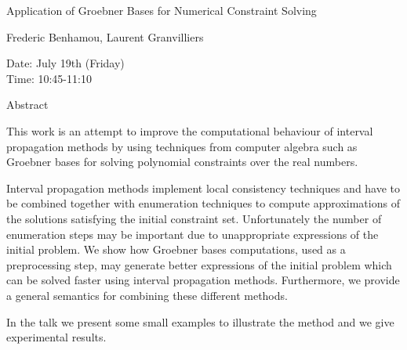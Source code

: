 \begin{center}
\LARGE
Application of Groebner Bases for Numerical Constraint
                             Solving

\end{center}

\begin{center}
\Large
Frederic Benhamou, Laurent Granvilliers

\end{center}

\noindent
Date:  July 19th (Friday)\\
Time:  10:45-11:10\\

\begin{center}
\large
Abstract
\end{center}

This work is an attempt to improve the computational behaviour of interval propagation methods
by using techniques from computer algebra such as Groebner bases for solving polynomial
constraints over the real numbers. 

Interval propagation methods implement local consistency techniques and have to be combined
together with enumeration techniques to compute approximations of the solutions satisfying the
initial constraint set. Unfortunately the number of enumeration steps may be important due to
unappropriate expressions of the initial problem. We show how Groebner bases computations,
used as a preprocessing step, may generate better expressions of the initial problem which can be
solved faster using interval propagation methods. Furthermore, we provide a general semantics for
combining these different methods. 

In the talk we present some small examples to illustrate the method and we give experimental
results. 

